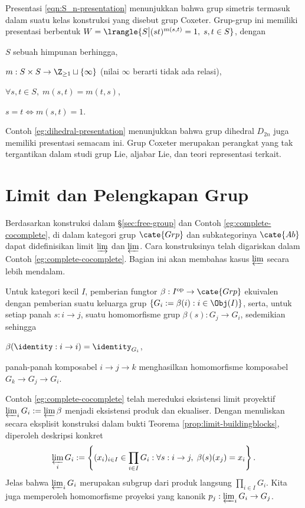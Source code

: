 Presentasi \eqref{eqn:S_n-presentation} menunjukkan bahwa grup simetris termasuk dalam suatu kelas konstruksi yang disebut grup Coxeter. Grup-grup ini memiliki presentasi berbentuk $W = \lrangle{S \big| (st)^{m(s,t)}=1, \; s,t \in S}$, dengan
\begin{compactitem}
	\item $S$ sebuah himpunan berhingga,
	\item $m: S \times S \to \Z_{\geq 1} \sqcup \{\infty\}$ (nilai $\infty$ berarti tidak ada relasi),
	\item $\forall s,t \in S, \; m(s,t)=m(t,s)$,
	\item $s=t \iff m(s,t)=1$.
\end{compactitem}
Contoh \ref{eg:dihedral-presentation} menunjukkan bahwa grup dihedral $D_{2n}$ juga memiliki presentasi semacam ini. Grup Coxeter merupakan perangkat yang tak tergantikan dalam studi grup Lie, aljabar Lie, dan teori representasi terkait. 

\section{Limit dan Pelengkapan Grup}\label{sec:group-limit}
Berdasarkan konstruksi dalam \S\ref{sec:free-group} dan Contoh \ref{eg:complete-cocomplete}, di dalam kategori grup $\cate{Grp}$ dan subkategorinya $\cate{Ab}$ dapat didefinisikan limit $\varinjlim$ dan $\varprojlim$. Cara konstruksinya telah digariskan dalam Contoh \ref{eg:complete-cocomplete}. Bagian ini akan membahas kasus $\varprojlim$ secara lebih mendalam.

Untuk kategori kecil $I$, pemberian fungtor $\beta: I^\text{op} \to \cate{Grp}$ ekuivalen dengan pemberian suatu keluarga grup $\{ G_i := \beta(i) : i \in \Obj(I) \}$, serta, untuk setiap panah $s: i \to j$, suatu homomorfisme grup $\beta(s): G_j \to G_i$, sedemikian sehingga
\begin{compactitem}
	\item $\beta(\identity: i \to i)=\identity_{G_i}$,
	\item panah-panah komposabel $i \to j \to k$ menghasilkan homomorfisme komposabel $G_k \to G_j \to G_i$.
\end{compactitem}
Contoh \ref{eg:complete-cocomplete} telah mereduksi eksistensi limit proyektif $\varprojlim_i G_i := \varprojlim \beta$ menjadi eksistensi produk dan ekualiser. Dengan menuliskan secara eksplisit konstruksi dalam bukti Teorema \ref{prop:limit-buildingblocks}, diperoleh deskripsi konkret
\[
	\varprojlim_i G_i := \left\{ (x_i)_{i \in I} \in \prod_{i \in I} G_i : \forall s: i \to j, \; \beta(s)(x_j) = x_i \right\}.
\]
Jelas bahwa $\varprojlim_i G_i$ merupakan subgrup dari produk langsung $\prod_{i \in I} G_i$. Kita juga memperoleh homomorfisme proyeksi yang kanonik $p_j: \varprojlim_i G_i \to G_j$.

